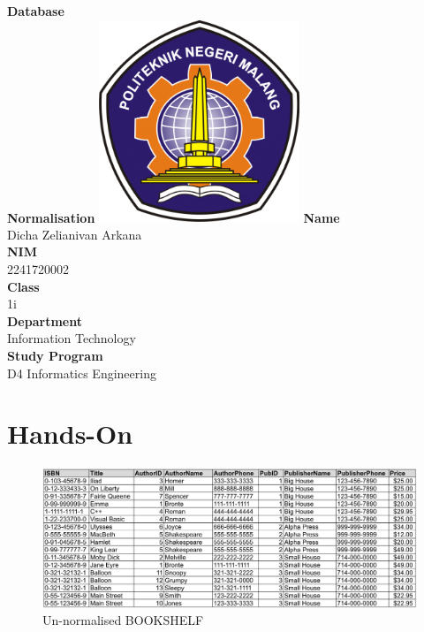 \documentclass[12pt,titlepage]{article}
\newcommand{\vSubject}{Database}
\newcommand{\vSubtitle}{Normalisation}
\newcommand{\vName}{Dicha Zelianivan Arkana}
\newcommand{\vNIM}{2241720002}
\newcommand{\vClass}{1i}
\newcommand{\vDepartment}{Information Technology}
\newcommand{\vStudyProgram}{D4 Informatics Engineering}
\begin{document}
\begin{titlepage}
    \centering
    \vfill
    {\bfseries\LARGE
        \vSubject\\
        \vskip0.25cm
        \vSubtitle
    }
    \vfill
    \includegraphics[width=6cm]{images/polinema-logo.png}
    \vfill
    {
        \textbf{Name}\\
        \vName\\
        \vskip0.5cm
        \textbf{NIM}\\
        \vNIM\\
        \vskip0.5cm
        \textbf{Class}\\
        \vClass\\
        \vskip0.5cm
        \textbf{Department}\\
        \vDepartment\\
        \vskip0.5cm
        \textbf{Study Program}\\
        \vStudyProgram
    }
\end{titlepage}

\section{Hands-On}

\begin{figure}[h]
    \centering
    \includegraphics[width=\textwidth]{images/un-normalised.png}
    \caption{Un-normalised BOOKSHELF}
\end{figure}
\end{document}
